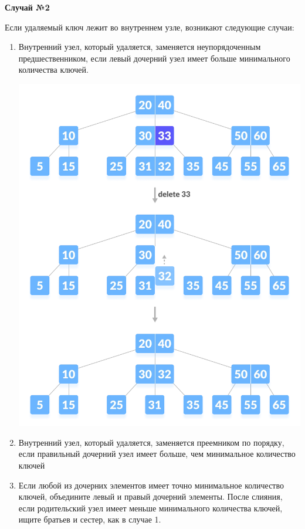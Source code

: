         \textbf{Случай №2} \par
        Если удаляемый ключ лежит во внутреннем узле, возникают следующие случаи: \par
        \begin{enumerate}
            \item Внутренний узел, который удаляется, заменяется неупорядоченным предшественником, если левый дочерний узел имеет больше минимального количества ключей.
            \begin{center}
                \includegraphics[width=0.8\linewidth]{удал 4.jpg} \par
            \end{center}
            \newpage
            \item Внутренний узел, который удаляется, заменяется преемником по порядку, если правильный дочерний узел имеет больше, чем минимальное количество ключей
            \item Если любой из дочерних элементов имеет точно минимальное количество ключей, объедините левый и правый дочерний элементы. После слияния, если родительский узел имеет меньше минимального количества ключей, ищите братьев и сестер, как в случае 1.
            \begin{center}

\end{center}
\end{enumerate}
